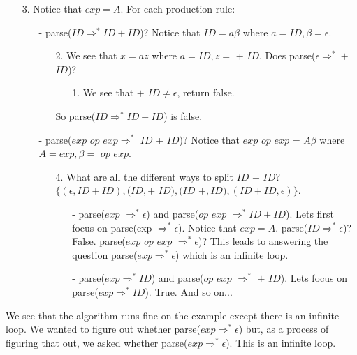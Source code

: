 \documentclass[12pt, letterpaper]{article}
\begin{document}
\begin{itemize}
	\item [3.] Notice that \(exp = A\). For each production rule:
	\begin{itemize}
		\item [-] parse(\(ID \Rightarrow^* ID + ID\))? Notice that \(ID = a\beta\) where \(a = ID, 			\beta = \epsilon\).
		\begin{itemize}
			\item [2.] We see that \(x = az\) where \(a = ID, z =\) + \(ID\). Does parse(\(\epsilon 			\Rightarrow^* + \) \(ID\))?
			\begin{itemize}
				\item [1.] We see that \(+\) \(ID \neq \epsilon\), return false.
			\end{itemize}
		So parse(\(ID \Rightarrow^* ID + ID\)) is false.
		\end{itemize}
		\item [-] parse(\(exp\) \(op\) \(exp \Rightarrow^*\) \(ID\) + \(ID\))? Notice that \(exp\) \(op\) \(exp\) = \(A\beta\) where \(A = exp, \beta =\) \(op\) \(exp\).
			\begin{itemize}
				\item [4.] What are all the different ways to split \(ID\) + \(ID\)? \(\{(\epsilon, ID + ID), (ID, +\) \(ID), (ID\) \(+, ID), (ID + ID, \epsilon)\}\). 
				\begin{itemize}
					\item [-] parse(\(exp\) \(\Rightarrow^* \epsilon\)) and parse(\(op\) \(exp\) \(\Rightarrow^* ID + ID\)). Lets first focus on parse(exp \(\Rightarrow^* \epsilon\)). Notice that \(exp = A\). parse(\(ID \Rightarrow^* \epsilon\))? False. parse(\(exp\) \(op\) \(exp\) \(\Rightarrow^* \epsilon\))? This leads to answering the question parse(\(exp \Rightarrow^* \epsilon\)) which is an infinite loop.
					\item [-] parse(\(exp \Rightarrow^* ID\)) and parse(\(op\) \(exp\) \(\Rightarrow^*\) \(+\) \(ID\)). Lets focus on parse(\(exp \Rightarrow^* ID\)). True. And so on...
				\end{itemize}
			\end{itemize}
	\end{itemize}
\end{itemize}

We see that the algorithm runs fine on the example except there is an infinite loop. We wanted to figure out whether parse(\(exp \Rightarrow^* \epsilon\)) but, as a process of figuring that out, we asked whether parse(\(exp \Rightarrow^* \epsilon\)). This is an infinite loop.\\
\end{document}
